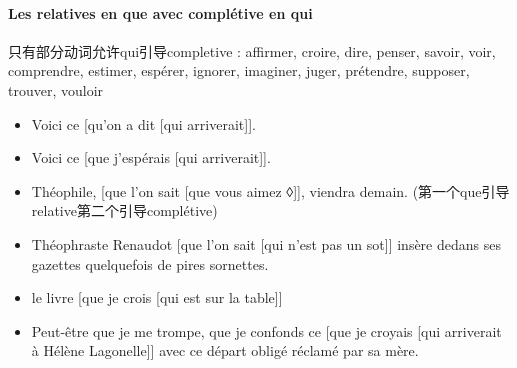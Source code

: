 \documentclass[UTF8]{report}
\begin{document}
\paragraph{Les relatives en que avec complétive en qui}
只有部分动词允许qui引导completive : affirmer, croire, dire, penser, savoir, voir, comprendre, estimer, espérer, ignorer, imaginer, juger, prétendre, supposer, trouver, vouloir
\begin{itemize}
    \item Voici ce [qu’on a dit [qui arriverait]].
    \item Voici ce [que j’espérais [qui arriverait]].
    \item Théophile, [que l’on sait [que vous aimez ◊]], viendra demain. (第一个que引导relative第二个引导complétive)
    \item Théophraste Renaudot [que l’on sait [qui n’est pas un sot]] insère dedans ses gazettes quelquefois de pires sornettes.
    \item le livre [que je crois [qui est sur la table]]
    \item Peut-être que je me trompe, que je confonds ce [que je croyais [qui arriverait à Hélène Lagonelle]] avec ce départ obligé réclamé par sa mère.
\end{itemize}
\end{document}

